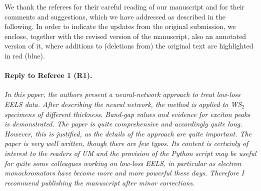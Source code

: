 \documentclass[12pt]{article}
\begin{document}
We thank the referees for their careful reading of our manuscript and for
their comments and suggestions, which we have addressed as described in the following.
In order to indicate the updates from the original submission, we enclose, together with
the revised version of the manuscript, also an annotated version of it, where
additions to (deletions from) the original text are highlighted in red (blue).


\paragraph{Reply to Referee 1 (R1).}

{\it In this paper, the authors present a neural-network approach to treat low-loss EELS data. After describing the neural network, the method is applied to WS$_2$ specimens of different thickness. Band-gap values and evidence for exciton peaks is demonstrated. The paper is quite comprehensive and accordingly quite long. However, this is justified, as the details of the approach are quite important. The paper is very well written, though there are few typos. Its content is certainly of interest to the readers of UM and the provision of the Python script may be useful for quite some colleagues working on low-loss EELS, in particular as electron monochromators have become more and more powerful these days.  Therefore I recommend publishing the manuscript after minor corrections.}
\end{document}
